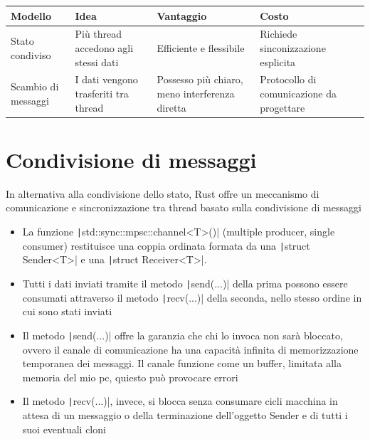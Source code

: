 \begin{table}[h!]
  \renewcommand{\arraystretch}{1.5}
  \centering
  \begin{tabularx}{\textwidth}{l X X X }
    \toprule
    \textbf{Modello}    & \textbf{Idea}                        & \textbf{Vantaggio}                             & \textbf{Costo}                            \\
    \midrule
    Stato condiviso     & Più thread accedono agli stessi dati & Efficiente e flessibile                        & Richiede sinconizzazione esplicita        \\
    Scambio di messaggi & I dati vengono trasferiti tra thread & Possesso più chiaro, meno interferenza diretta & Protocollo di comunicazione da progettare \\
    \bottomrule
  \end{tabularx}
\end{table}

\section{Condivisione di messaggi}
In alternativa alla condivisione dello stato, Rust offre un meccanismo di
comunicazione e sincronizzazione tra thread basato sulla condivisione di messaggi

\begin{itemize}
  \item La funzione \texttt|std::sync::mpsc::channel<T>()| (multiple producer, single consumer) restituisce una coppia ordinata formata da una \texttt|struct Sender<T>| e una \texttt|struct Receiver<T>|.
  \item Tutti i dati inviati tramite il metodo \texttt|send(...)| della prima possono essere consumati attraverso il metodo \texttt|recv(...)| della seconda, nello stesso ordine in cui sono stati inviati
  \item Il metodo \texttt|send(...)| offre la garanzia che chi lo invoca non sarà bloccato, ovvero il canale di comunicazione ha una capacità infinita di memorizzazione temporanea dei messaggi. Il canale funzione come un buffer, limitata alla memoria del mio pc, quiesto può provocare errori
  \item Il metodo \texttt|recv(...)|, invece, si blocca senza
        consumare cicli macchina in attesa di un messaggio o della terminazione
        dell'oggetto Sender e di tutti i suoi eventuali cloni

\end{itemize}

